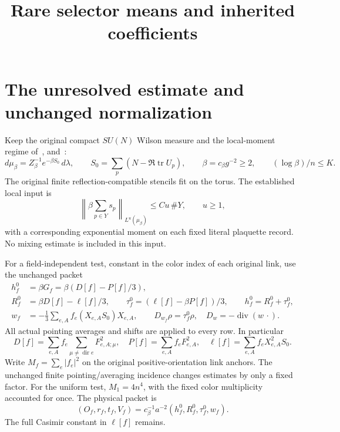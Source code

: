 \documentclass[11pt,letterpaper]{article}
\title{Rare selector means and inherited coefficients}\author{}\date{}
\theoremstyle{remark}\newtheorem{remark}[theorem]{Remark}
\newcommand{\tr}{\operatorname{tr}}
\newcommand{\diver}{\operatorname{div}}\newcommand{\Ad}{\operatorname{Ad}}
\newcommand{\cB}{c_\beta}\newcommand{\dd}{\,d}
\newcommand{\norm}[1]{\left\lVert#1\right\rVert}
\begin{document}
\maketitle
\section{The unresolved estimate and unchanged normalization}

Keep the original compact \(SU(N)\) Wilson measure and the local-moment regime of~\cite[\S2]{ND}, \cite[\S1]{SZ} and~\cite[\S1]{OS}:
\begin{equation}\label{eq:law}
 d\mu_\beta=Z_\beta^{-1}e^{-\beta S_0}\dd\lambda,\qquad
 S_0=\sum_p(N-\Re\tr U_p),\qquad
 \beta=\cB g^{-2}\ge2,\qquad (\log\beta)/n\le K.
\end{equation}
The original finite reflection-compatible stencils fit on the torus. The established local input is
\begin{equation}\label{eq:local}
 \norm{\beta\sum_{p\in Y}s_p}_{L^u(\mu_\beta)}
 \le C u\,\#Y,\qquad u\ge1,
\end{equation}
with a corresponding exponential moment on each fixed literal plaquette record. No mixing estimate is included in this input.

For a field-independent test, constant in the color index of each original link, use the unchanged packet
\begin{align}\label{eq:packet}
 h_f^0&=\beta G_f=\beta(D[f]-P[f]/3),\\
 R_f^0&=\beta D[f]-\ell[f]/3,\qquad
 \tau_f^0=(\ell[f]-\beta P[f])/3,\qquad h_f^0=R_f^0+\tau_f^0,\nonumber\\
 w_f&=-\tfrac13\sum_{e,A}f_e(X_{e,A}S_0)X_{e,A},\qquad
 D_{w_f}\rho=\tau_f^0\rho,\quad D_w=-\diver(w\,\cdot).\nonumber
\end{align}
All actual pointing averages and shifts are applied to every row. In particular
\[
 D[f]=\sum_{e,A}f_e\sum_{\mu\ne\operatorname{dir}e}F_{e,A;\mu}^2,\quad
 P[f]=\sum_{e,A}f_eF_{e,A}^2,\quad
 \ell[f]=\sum_{e,A}f_eX_{e,A}^2S_0.
\]
Write \(M_f=\sum_e|f_e|^2\) on the original positive-orientation link anchors. The unchanged finite pointing/averaging incidence changes estimates by only a fixed factor. For the uniform test, \(M_1=4n^4\), with the fixed color multiplicity accounted for once.
The physical packet is
\begin{equation}\label{eq:physical}
 (O_f,r_f,t_f,V_f)=\cB^{-1}a^{-2}(h_f^0,R_f^0,\tau_f^0,w_f).
\end{equation}
The full Casimir constant in \(\ell[f]\) remains.
\end{document}
